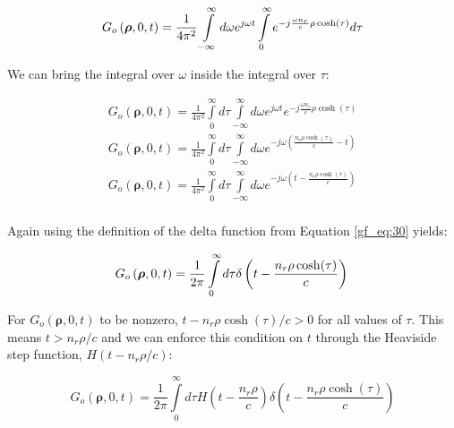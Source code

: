 \begin{equation}
G_o\left(\boldsymbol{\rho},0,t\right) = \frac{1}{4\pi^2}\int\limits_{-\infty}^{\infty}d\omega e^{j\omega t} \int\limits_{0}^{\infty}e^{-j\frac{\omega n_r}{c}\rho\cosh(\tau)}d\tau\\
\label{gf_eq:40d}
\end{equation}
\renewcommand{\baselinestretch}{2} \small\normalsize

\noindent We can bring the integral over $\omega$ inside the integral over $\tau$:

\begin{equation}
\begin{gathered}
G_o\left(\boldsymbol{\rho},0,t\right) = \frac{1}{4\pi^2}\int\limits_{0}^{\infty}d\tau\int\limits_{-\infty}^{\infty}d\omega e^{j\omega t} e^{-j\frac{\omega n_r}{c}\rho\cosh(\tau)}\\
G_o\left(\boldsymbol{\rho},0,t\right) = \frac{1}{4\pi^2}\int\limits_{0}^{\infty}d\tau\int\limits_{-\infty}^{\infty}d\omega e^{-j\omega \left(\frac{n_r\rho \cosh(\tau)}{c} - t\right)}\\
G_o\left(\boldsymbol{\rho},0,t\right) = \frac{1}{4\pi^2}\int\limits_{0}^{\infty}d\tau\int\limits_{-\infty}^{\infty}d\omega e^{-j\omega \left(t - \frac{n_r\rho \cosh(\tau)}{c}\right)}\\
\end{gathered}
\label{gf_eq:40e}
\end{equation}
\renewcommand{\baselinestretch}{2} \small\normalsize

\noindent Again using the definition of the delta function from Equation \ref{gf_eq:30} yields:

\begin{equation}
G_o\left(\boldsymbol{\rho},0,t\right) = \frac{1}{2\pi}\int\limits_{0}^{\infty}d\tau \delta\left(t - \frac{n_r\rho \cosh(\tau)}{c}\right)\\
\label{gf_eq:40f}
\end{equation}
\renewcommand{\baselinestretch}{2} \small\normalsize

For $G_o\left(\boldsymbol{\rho},0,t\right)$ to be nonzero, $t - n_r\rho \cosh(\tau)/c > 0$ for all values of $\tau$. This means $t > n_r\rho/c$ and we can enforce this condition on $t$ through the Heaviside step function, $H\left(t -n_r\rho/c\right)$:

 \begin{equation}
G_o\left(\boldsymbol{\rho},0,t\right) = \frac{1}{2\pi}\int\limits_{0}^{\infty}d\tau H\left(t -\frac{n_r\rho}{c}\right) \delta\left(t - \frac{n_r\rho \cosh(\tau)}{c}\right)
\label{gf_eq:40g}
\end{equation}
 \renewcommand{\baselinestretch}{2} \small\normalsize
 
